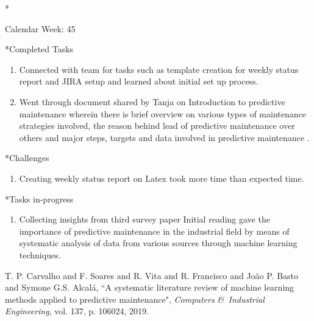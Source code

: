 \documentclass[11pt,a4paper]{article}
\begin{document}
\begin{section}*{Calendar Week: 45 \hfill \date{06 November, 2020}}

\begin{subsection}*{Completed Tasks}
    \begin{enumerate}
        \item
            Connected with team for tasks such as template creation for weekly status report and JIRA setup and learned about initial set up process.
        \item
            Went through document shared by Tanja on Introduction to predictive maintenance wherein there is brief overview on various types of maintenance strategies involved, the reason behind lead of predictive maintenance over others and major steps, targets and data involved in predictive maintenance .

    \end{enumerate}
\end{subsection}
\begin{subsection}*{Challenges}
     \begin{enumerate}
         \item
            Creating weekly status report on Latex took more time than expected time.
        
\end{enumerate}
\end{subsection}
\begin{subsection}*{Tasks in-progress}
    \begin{enumerate}
        \item
            Collecting insights from third survey paper \cite{survey3} Initial reading gave the importance of predictive maintenance in the industrial field by means of systematic analysis of data from various sources through machine learning techniques.
 
    \end{enumerate}
\end{subsection}
\begin{thebibliography}{9}
    {T. P. Carvalho and F. Soares and R. Vita and R. Francisco and Jo{\~a}o P. Basto and Symone G.S. Alcal{\'a}},
    “A systematic literature review of machine learning methods applied to predictive maintenance",
    \textit{Computers \&\ Industrial Engineering},
    vol. 137,
    p. 106024,
    2019.
\end{thebibliography}
\end{section}
\end{document}
